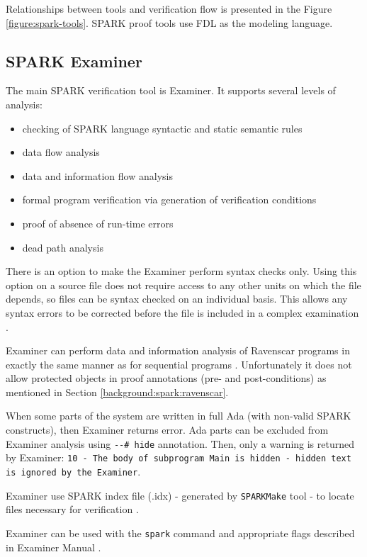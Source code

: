 Relationships between tools and verification flow is presented in the Figure \ref{figure:spark-tools}. SPARK proof tools use FDL as the modeling language. 



\subsection{SPARK Examiner}
\label{background:sparkverification:examiner}

The main SPARK verification tool is Examiner. It supports several levels of analysis:
\begin{itemize}
	\item checking of SPARK language syntactic and static semantic rules
	\item data flow analysis
	\item data and information flow analysis
	\item formal program verification via generation of verification conditions
	\item proof of absence of run-time errors
	\item dead path analysis
\end{itemize}

There is an option to make the Examiner perform syntax checks only. Using this option on a source file does not require access to any other units on which the file depends, so files can be syntax checked on an individual basis. This allows any syntax errors to be corrected before the file is included in a complex examination \cite{Examiner:Online}.

Examiner can perform data and information analysis of Ravenscar programs in exactly the same manner as for sequential programs \cite{Ravenscar:Online}. Unfortunately it does not allow protected objects in proof annotations (pre- and post-conditions) as mentioned in Section \ref{background:spark:ravenscar}.

When some parts of the system are written in full Ada (with non-valid SPARK constructs), then Examiner returns error. Ada parts can be excluded from Examiner analysis using \lstinline{--# hide} annotation. Then, only a warning is returned by Examiner: \lstinline{10 - The body of subprogram Main is hidden - hidden text is ignored by the Examiner}.

Examiner use SPARK index file (.idx) - generated by \lstinline{SPARKMake} tool -  to locate files necessary for verification \cite{Barnes:Book}.

Examiner can be used with the \lstinline{spark} command and appropriate flags described in Examiner Manual \cite{Examiner:Online}.

